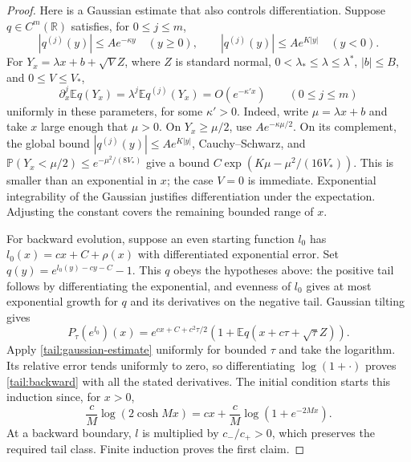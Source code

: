 \begin{proof}
Here is a Gaussian estimate that also controls differentiation.  Suppose
$q\in C^m(\mathbb R)$ satisfies, for $0\le j\le m$,
\[
 |q^{(j)}(y)|\le A e^{-\kappa y}\quad(y\ge0),\qquad
 |q^{(j)}(y)|\le A e^{K|y|}\quad(y<0).
\]
For $Y_x=\lambda x+b+\sqrt V Z$, where $Z$ is standard normal,
$0<\lambda_*\le\lambda\le\lambda^*$, $|b|\le B$, and $0\le V\le V_*$,
\begin{equation}\label{tail:gaussian-estimate}
 \partial_x^j\mathbb E q(Y_x)
       =\lambda^j\mathbb E q^{(j)}(Y_x)=O(e^{-\kappa' x})
       \qquad(0\le j\le m)
\end{equation}
uniformly in these parameters, for some $\kappa'>0$.
Indeed, write $\mu=\lambda x+b$ and take $x$ large enough that $\mu>0$.
On $Y_x\ge\mu/2$, use $Ae^{-\kappa\mu/2}$.  On its complement,
the global bound $|q^{(j)}(y)|\le A e^{K|y|}$, Cauchy--Schwarz, and
$\mathbb P(Y_x<\mu/2)\le e^{-\mu^2/(8V_*)}$ give a bound
$C\exp(K\mu-\mu^2/(16V_*))$.  This is smaller than an exponential
in $x$; the case $V=0$ is immediate.  Exponential integrability of the
Gaussian justifies differentiation under the expectation.  Adjusting the
constant covers the remaining bounded range of $x$.

For backward evolution, suppose an even starting function $l_0$ has
$l_0(x)=cx+C+\rho(x)$ with differentiated exponential error.  Set
$q(y)=e^{l_0(y)-cy-C}-1$.  This $q$ obeys the hypotheses above: the
positive tail follows by differentiating the exponential, and evenness of
$l_0$ gives at most exponential growth for $q$ and its derivatives on the
negative tail.  Gaussian tilting gives
\[
 P_\tau(e^{l_0})(x)
 =e^{cx+C+c^2\tau/2}
   \left(1+\mathbb E q(x+c\tau+\sqrt\tau Z)\right).
\]
Apply \eqref{tail:gaussian-estimate} uniformly for bounded $\tau$ and take
the logarithm.  Its relative error tends uniformly to zero, so differentiating
$\log(1+\cdot)$ proves \eqref{tail:backward} with all the stated derivatives.
The initial condition starts this induction since, for $x>0$,
\[
 \frac cM\log(2\cosh Mx)
       =cx+\frac cM\log(1+e^{-2Mx}).
\]
At a backward boundary, $l$ is multiplied by $c_-/c_+>0$, which
preserves the required tail class.  Finite induction proves the first claim.


\end{proof}
